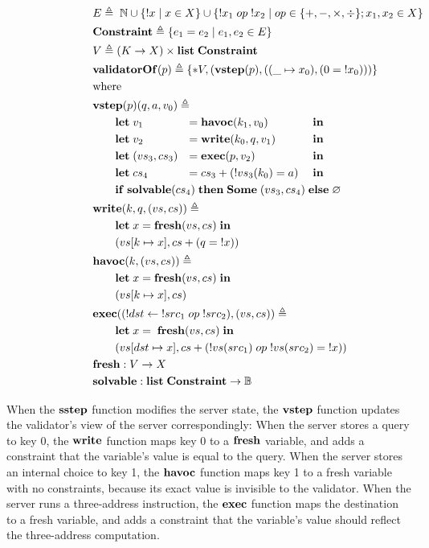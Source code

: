 \documentclass{article}
\theoremstyle{definition}
\newcommand{\Nat}{\mathbb N}
\newcommand{\Let}{\ottkw{let}\;}
\newcommand{\In}{\;\ottkw{in}}
\newcommand{\letin}[2]{\Let#1=#2\In}
\newcommand{\existT}[2]{\{*#1,#2\}}
\newcommand{\sstep}{\ottkw{sstep}}
\newcommand{\vstep}{\ottkw{vstep}}
\newcommand{\Some}[1]{\ottkw{Some}\;#1}
\newcommand{\None}{\varnothing}
\newcommand{\List}{\ottkw{list}\;}
\newcommand{\validatorOf}{\ottkw{validatorOf}}
\newcommand{\Constraint}{\ottkw{Constraint}}
\newcommand{\fresh}{\ottkw{fresh}}
\newcommand{\solvable}{\ottkw{solvable}}
\newcommand{\Write}{\ottkw{write}}
\newcommand{\Havoc}{\ottkw{havoc}}
\newcommand{\Exec}{\ottkw{exec}}
\newcommand{\If}{\ottkw{if}\;}
\newcommand{\Then}{\ottkw{then}\;}
\newcommand{\Else}{\ottkw{else}\;}
\newcommand{\bool}{\mathbb B}
\begin{document}
\begin{align*}
  \rlap{$E\triangleq\; \Nat \cup \{!x\mid x\in X\} \cup \{!x_1\;op\;!x_2\mid
    op\in\{+,-,\times,\div\}; x_1,x_2\in X\}$}\\
  \rlap{$\Constraint\triangleq\{e_1=e_2\mid e_1,e_2\in E\}$}\\
  \rlap{$V\triangleq(K\to X)\times\List\Constraint$}\\
  \rlap{$\validatorOf(p)\triangleq\existT{V}{(\vstep(p), ((\_\mapsto x_0),(0=\;!x_0)))}$}\\
  \rlap{where}\\
  \rlap{$\vstep(p)(q,a,v_0)\triangleq\;$}\\
  &\qquad\letin{v_1&}{\;&\Havoc(k_1,v_0)&}\\
  &\qquad\letin{v_2&}{\;&\Write(k_0,q,v_1)&}\\
  &\qquad\letin{(vs_3,cs_3)&}{\;&\Exec(p,v_2)&}\\
  &\qquad\letin{cs_4&}{\;&cs_3+(!vs_3(k_0)=a)&}\\
  \rlap{$\qquad\If \solvable(cs_4)\;\Then \Some{(vs_3,cs_4)}\;\Else \None$}\\
  \rlap{$\Write(k,q,(vs,cs))\triangleq$}\\
  \rlap{$\qquad\letin{x}{\fresh(vs,cs)}$}\\
  \rlap{$\qquad(vs[k\mapsto x],cs+(q=\;!x))$}\\
  \rlap{$\Havoc(k,(vs,cs))\triangleq$}\\
  \rlap{$\qquad\letin{x}{\fresh(vs,cs)}$}\\
  \rlap{$\qquad(vs[k\mapsto x],cs)$}\\
  \rlap{$\Exec((!dst\gets\;!src_1\;op\;!src_2),(vs,cs))\triangleq$}\\
  \rlap{$\qquad\letin{x}{\;\fresh(vs,cs)}$}\\
  \rlap{$\qquad(vs[dst\mapsto x],cs+(!vs(src_1)\;op\;!vs(src_2)=\;!x))$}\\
  \rlap{$\fresh:V\to X$}\\
  \rlap{$\solvable:\List\Constraint\to\bool$}
\end{align*}

When the $\sstep$ function modifies the server state, the $\vstep$ function
updates the validator's view of the server correspondingly: When the server
stores a query to key 0, the $\Write$ function maps key 0 to a $\fresh$
variable, and adds a constraint that the variable's value is equal to the query.
When the server stores an internal choice to key 1, the $\Havoc$ function maps
key 1 to a fresh variable with no constraints, because its exact value is
invisible to the validator.  When the server runs a three-address instruction,
the $\Exec$ function maps the destination to a fresh variable, and adds a
constraint that the variable's value should reflect the three-address
computation.
\end{document}
